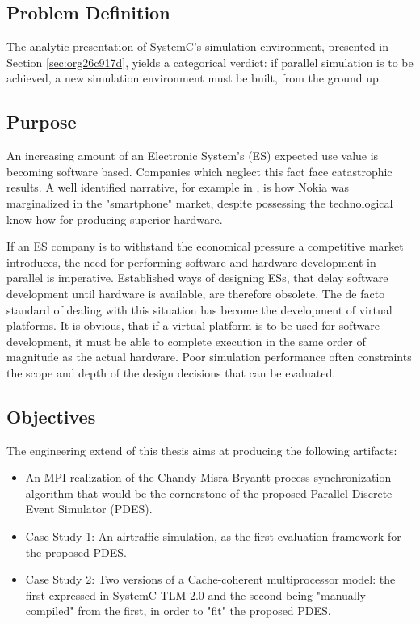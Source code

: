 \documentclass[11pt]{article}
\begin{document}
\subsection{Problem Definition}
\label{sec:org8d667a6}
The analytic presentation of SystemC's simulation environment, 
presented in Section \ref{sec:org26c917d}, 
yields a categorical verdict: if parallel simulation is to be achieved, 
a new simulation environment must be built, from the ground up.

\subsection{Purpose}
\label{sec:orga660732}
An increasing amount of an Electronic System's (ES) expected use value is becoming software based.
Companies which neglect this fact face catastrophic results.
A well identified narrative, for example in \cite{Surowiecki2013}, 
is how Nokia was marginalized in the "smartphone" market, 
despite possessing the technological know-how for producing superior hardware.

If an ES company is to withstand the economical pressure a competitive market introduces, the need for performing software and hardware development in parallel is imperative.
Established ways of designing ESs, that delay software development until hardware is available, are therefore obsolete.
The de facto standard of dealing with this situation has become the development of virtual platforms.
It is obvious, that if a virtual platform is to be used for software development, it must be able to complete execution in the same order of magnitude as the actual hardware.
Poor simulation performance often constraints the scope and depth of the design decisions that can be evaluated.

\subsection{Objectives}
\label{sec:orgb9c1b8d}
The engineering extend of this thesis aims at producing the following artifacts:
\begin{itemize}
\item An MPI realization of the Chandy Misra Bryantt process synchronization algorithm that would be the cornerstone of the proposed Parallel Discrete Event Simulator (PDES).
\item Case Study 1: An airtraffic simulation, as the first evaluation framework for the proposed PDES.
\item Case Study 2: Two versions of a Cache-coherent multiprocessor model: the first expressed in SystemC TLM 2.0 and the second being "manually compiled" from the first, in order to "fit" the proposed PDES.
\end{itemize}
\end{document}
